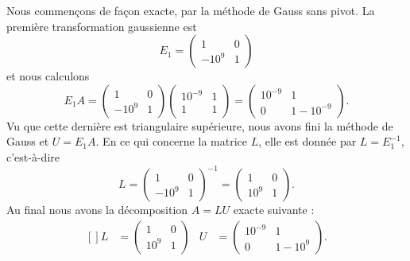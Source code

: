 \begin{example}     \label{ExooNTECooXvTcoh}
	Nous commençons de façon exacte, par la méthode de Gauss sans pivot. La première transformation gaussienne est
	\begin{equation}
		E_1=\begin{pmatrix}
			1     & 0 \\
			-10^9 & 1
		\end{pmatrix}
	\end{equation}
	et nous calculons
	\begin{equation}
		E_1A=\begin{pmatrix}
			1     & 0 \\
			-10^9 & 1
		\end{pmatrix}\begin{pmatrix}
			10^{-9} & 1 \\
			1       & 1
		\end{pmatrix}=
		\begin{pmatrix}
			10^{-9} & 1         \\
			0       & 1-10^{-9}
		\end{pmatrix}.
	\end{equation}
	Vu que cette dernière est triangulaire supérieure, nous avons fini la méthode de Gauss et \( U=E_1A\). En ce qui concerne la matrice \( L\), elle est donnée par \( L=E_1^{-1}\), c'est-à-dire
	\begin{equation}
		L=\begin{pmatrix}
			1     & 0 \\
			-10^9 & 1
		\end{pmatrix}^{-1}=
		\begin{pmatrix}
			1    & 0 \\
			10^9 & 1
		\end{pmatrix}.
	\end{equation}
	Au final nous avons la décomposition \( A=LU\) exacte suivante :
	\begin{equation}
		\begin{aligned}[]
			L & =\begin{pmatrix}
				     1    & 0 \\
				     10^9 & 1
			     \end{pmatrix} & U & =\begin{pmatrix}
				                          10^{-9} & 1      \\
				                          0       & 1-10^9
			                          \end{pmatrix}.
		\end{aligned}

\end{equation}
\end{example}
